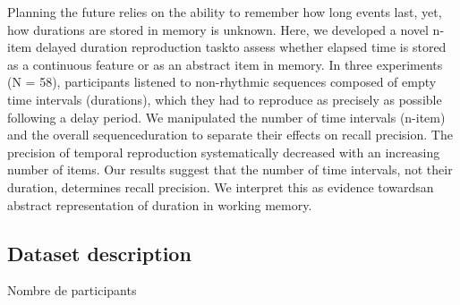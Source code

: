 Planning the future relies on the ability to remember how long events last, yet, how durations  are  stored  in  memory  is  unknown.  Here,  we  developed  a  novel n-item delayed duration reproduction taskto assess whether elapsed time is stored as a continuous feature or as an abstract item in memory. In three experiments (N = 58), participants listened to non-rhythmic sequences composed of empty time intervals (durations), which they had to reproduce as precisely as possible following a delay period.  We  manipulated  the  number  of  time  intervals  (n-item)  and  the  overall sequenceduration  to separate  their effects  on  recall  precision.  The  precision  of temporal reproduction systematically decreased with an increasing number of items. Our results suggest that the number of time intervals, not their duration, determines recall precision. We interpret this as evidence towardsan abstract representation of duration in working memory.


\subsection{Dataset description}


Nombre de participants


